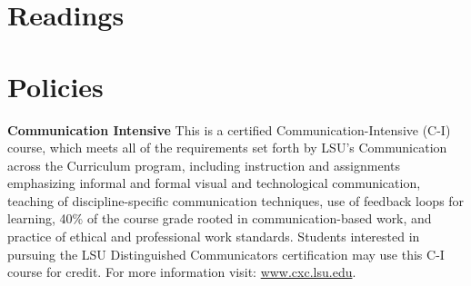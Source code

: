 \documentclass[11pt,article,oneside]{memoir}
\begin{document}
%
%
%

\section{Readings}
\vspace*{0.5cm}
\nocite{*}
\setlength{}
\printbibliography[heading=none]


\section{Policies}

\noindent \textbf{Communication Intensive}
This is a certified Communication-Intensive (C-I) course,
which meets all of the requirements set
forth by LSU’s Communication across the Curriculum program, 
including instruction and assignments emphasizing
informal and formal visual and technological communication,
teaching of discipline-specific communication techniques,
use of feedback loops for learning,
40\% of the course grade rooted in communication-based work, 
and practice of ethical and professional work standards.
Students interested in pursuing the LSU Distinguished Communicators 
certification may use this C-I course for credit. 
For more information visit: 
\url{www.cxc.lsu.edu}.\\
\end{document}
